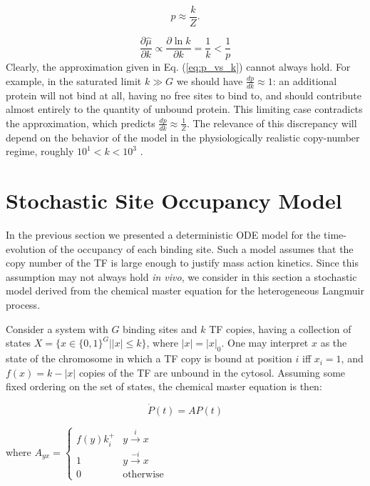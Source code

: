 \documentclass{article}
\begin{document}
\begin{equation}
  \label{eq:p_vs_k}
  p \approx \frac{k}{Z}.
\end{equation}

\begin{equation}
  \frac{\partial\hat\mu}{\partial k}\propto \frac{\partial\ln k}{\partial k} = \frac{1}{k} < \frac{1}{p}
\end{equation}
Clearly, the approximation given in Eq. (\ref{eq:p_vs_k}) cannot
always hold.  For example, in the saturated limit $k\gg G$ we should
have $\frac{dp}{dk}\approx 1$: an additional protein will not bind at
all, having no free sites to bind to, and should contribute almost
entirely to the quantity of unbound protein. This limiting case
contradicts the approximation, which predicts $\frac{dp}{dk}\approx
\frac{1}{Z}$.  The relevance of this discrepancy will depend on the
behavior of the model in the physiologically realistic copy-number
regime, roughly $10^1 < k < 10^3$ \cite{ishihama08}.  

\section{Stochastic Site Occupancy Model}
In the previous section we presented a deterministic ODE model for the
time-evolution of the occupancy of each binding site.  Such a model
assumes that the copy number of the TF is large enough to justify mass
action kinetics.  Since this assumption may not always hold \textit{in
  vivo}, we consider in this section a stochastic model derived from
the chemical master equation for the heterogeneous Langmuir process.

Consider a system with $G$ binding sites and $k$ TF copies, having a
collection of states $X = \{x \in \{0,1\}^G | |x| \leq k\}$, where
$|x| = |x|_0$.  One may interpret $x$ as the state of the chromosome
in which a TF copy is bound at position $i$ iff $x_i = 1$, and $f(x) =
k - |x|$ copies of the TF are unbound in the cytosol.  Assuming some
fixed ordering on the set of states, the chemical master equation is
then:

\begin{equation}
  \label{eq:cme}
  \dot P(t) = A P(t)
\end{equation}

where $A_{yx} =
\begin{cases}
  f(y) k_i^+ & y \overset{i}{\rightarrow} x\\
  1 & y \overset{-i}{\rightarrow} x \\
  0 & \textrm{otherwise}
\end{cases}
$
\end{document}
